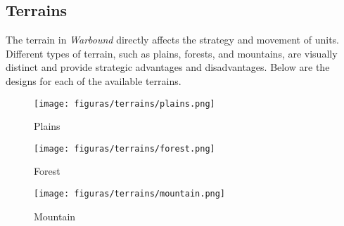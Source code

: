 \subsection{Terrains}

The terrain in \textit{Warbound} directly affects the strategy and movement of units. Different types of terrain, such as plains, forests, and mountains, are visually distinct and provide strategic advantages and disadvantages. Below are the designs for each of the available terrains.

\begin{figure}[H]
    \centering
    \begin{minipage}{0.1\textwidth}
        \centering
        \texttt{[image: figuras/terrains/plains.png]}
        \caption{Plains}
    \end{minipage}\hspace{0.03\textwidth}
    \begin{minipage}{0.12\textwidth}
        \centering
        \texttt{[image: figuras/terrains/forest.png]}
        \caption{Forest}
    \end{minipage}\hspace{0.03\textwidth}
    \begin{minipage}{0.12\textwidth}
        \centering
        \texttt{[image: figuras/terrains/mountain.png]}
        \caption{Mountain}
    \end{minipage}
\end{figure}

